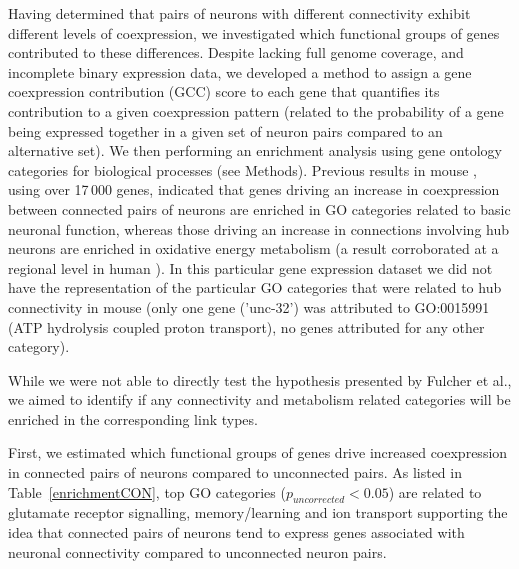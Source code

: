 \documentclass[10pt,letterpaper]{article}
\begin{document}
Having determined that pairs of neurons with different connectivity exhibit different levels of coexpression, we investigated which functional groups of genes contributed to these differences.
Despite lacking full genome coverage, and incomplete binary expression data, we developed a method to assign a gene coexpression contribution (GCC) score to each gene that quantifies its contribution to a given coexpression pattern (related to the probability of a gene being expressed together in a given set of neuron pairs compared to an alternative set).
We then performing an enrichment analysis using gene ontology categories for biological processes (see Methods).
Previous results in mouse \cite{Fulcher:2016ck}, using over 17\,000 genes, indicated that genes driving an increase in coexpression between connected pairs of neurons are enriched in GO categories related to basic neuronal function, whereas those driving an increase in connections involving hub neurons are enriched in oxidative energy metabolism (a result corroborated at a regional level in human \cite{Vertes2016a}).
In this particular gene expression dataset we did not have the representation of the particular GO categories that were related to hub connectivity in mouse (only one gene ('unc-32') was attributed to GO:0015991 (ATP hydrolysis coupled proton transport), no genes attributed for any other category).


While we were not able to directly test the hypothesis presented by Fulcher et al.\cite{Fulcher2016}, we aimed to identify if any connectivity and metabolism related categories will be enriched in the corresponding link types. 

First, we estimated which functional groups of genes drive increased coexpression in connected pairs of neurons compared to unconnected pairs.
As listed in Table~\ref{enrichmentCON}, top GO categories ($p_{uncorrected} < 0.05$) are related to glutamate receptor signalling, memory/learning and ion transport supporting the idea that connected pairs of neurons tend to express genes associated with neuronal connectivity compared to unconnected neuron pairs.\\
\end{document}
